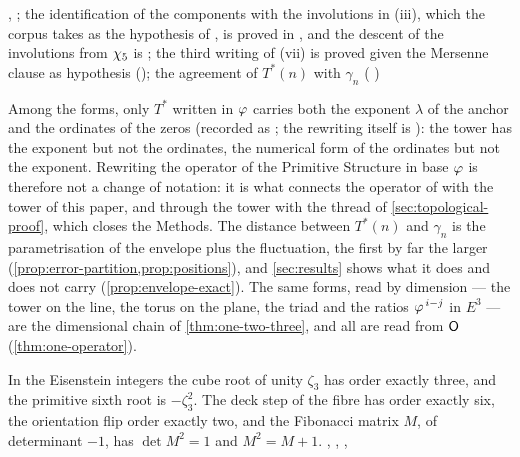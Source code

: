 \begin{theorem}
, ;
the identification of the components with the involutions in (iii), which the corpus takes as the hypothesis
of , is proved in
, and the
descent of the involutions from $\chi_5$ is ; the third writing of (vii) is proved
given the Mersenne clause as hypothesis ();
the agreement of $T^*(n)$ with $\gamma_n$ ( )%
\end{theorem}

\begin{remark}\label{rmk:tstar-bridge}
Among the forms, only $T^*$ written in $\varphi$ carries both the exponent $\lambda$ of the
anchor and the ordinates of the zeros (recorded as ; the
rewriting itself is ): the
tower has the exponent but not the ordinates, the numerical form of
\cite{gonzalez25hp} the ordinates but not the exponent.  Rewriting the operator of the Primitive Structure in base $\varphi$ is therefore not a change of notation: it is what connects
the operator of \cite{gonzalez25hp} with the tower of this paper, and through the tower
with the thread of \cref{sec:topological-proof}, which closes the Methods.  The distance between $T^*(n)$ and
$\gamma_n$ is the parametrisation of the envelope plus the fluctuation, the first by far the
larger (\cref{prop:error-partition,prop:positions}), and \cref{sec:results} shows what it does and
does not carry (\cref{prop:envelope-exact}).  The same forms, read by dimension ---
the tower on the line, the torus on the plane, the triad and the ratios
$\varphi^{\,i-j}$ in $E^3$ --- are the dimensional chain of \cref{thm:one-two-three}, and all are read from $\mathsf{O}$ (\cref{thm:one-operator}).
\end{remark}

\begin{proposition}\label{prop:eisenstein-deck}
In the Eisenstein integers the cube root of unity $\zeta_3$ has order exactly three,
and the primitive sixth root is $-\zeta_3^2$.  The deck step of the fibre has order
exactly six, the orientation flip order exactly two, and the Fibonacci matrix $M$,
of determinant $-1$, has $\det M^2=1$ and $M^2=M+1$.
, , ,

\end{proposition}


